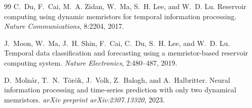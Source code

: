 \documentclass{article}
\begin{document}
\begin{thebibliography}{99}
C.~Du, F.~Cai, M.~A. Zidan, W.~Ma, S.~H. Lee, and W.~D. Lu.
\newblock Reservoir computing using dynamic memristors for temporal information processing.
\newblock \emph{Nature Communications}, 8:2204, 2017.

J.~Moon, W.~Ma, J.~H. Shin, F.~Cai, C.~Du, S.~H. Lee, and W.~D. Lu.
\newblock Temporal data classification and forecasting using a memristor-based reservoir computing system.
\newblock \emph{Nature Electronics}, 2:480--487, 2019.

D.~Moln{\'a}r, T.~N.~T{\"o}r{\"o}k, J.~Volk, Z.~Balogh, and A.~Halbritter.
\newblock Neural information processing and time-series prediction with only two dynamical memristors.
\newblock \emph{arXiv preprint arXiv:2307.13320}, 2023.

\end{thebibliography}
\end{document}
